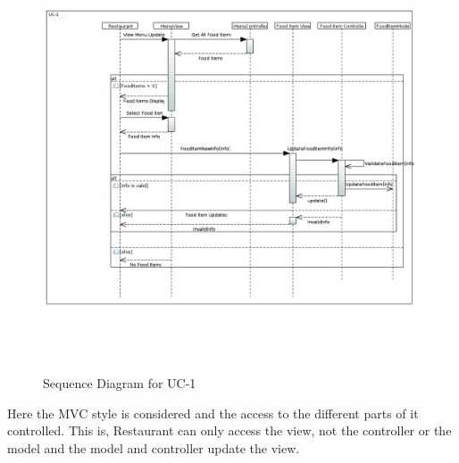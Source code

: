 \begin{figure}[h!]
\begin{center}
\includegraphics[scale=0.35]{FIGS/UC-11.PNG}
    \caption{Sequence Diagram for UC-1}
    \label{fig:seq_diag1}
\end{center}
\end{figure}

Here the MVC style is considered and the access to the different parts of it controlled. This is, Restaurant can only access the view, not the controller or the model and the model and controller update the view.
